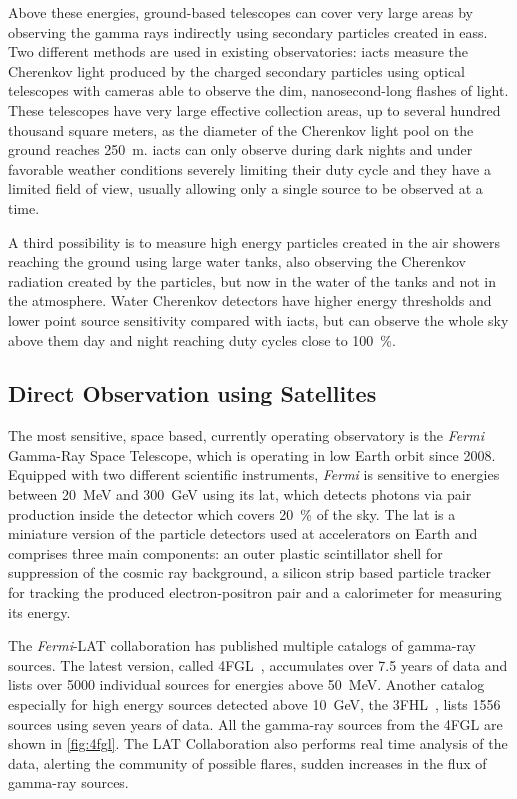 Above these energies, ground-based telescopes can cover very large areas by observing
the gamma rays indirectly using secondary particles created in \glspl{eas}.
Two different methods are used in existing observatories:
\glspl{iact} measure the Cherenkov light produced by the charged secondary particles
using optical telescopes with cameras able to observe the dim, nanosecond-long flashes
of light.
These telescopes have very large effective collection areas, up to several hundred thousand square meters,
as the diameter of the Cherenkov light pool on the ground reaches \SI{250}{\meter}.
\glspl{iact} can only observe during dark nights and under favorable weather conditions
severely limiting their duty cycle and they have a limited field of view, usually
allowing only a single source to be observed at a time.

A third possibility is to measure high energy particles created in the air showers
reaching the ground using large water tanks, also observing the Cherenkov radiation
created by the particles, but now in the water of the tanks and not in the atmosphere.
Water Cherenkov detectors have higher energy thresholds and lower point source
sensitivity compared with \glspl{iact}, but can observe the whole sky above them
day and night reaching duty cycles close to \SI{100}{\percent}.

\subsection{Direct Observation using Satellites}
The most sensitive, space based,
currently operating observatory is the \textit{Fermi} Gamma-Ray Space Telescope,
which is operating in low Earth orbit since 2008.
Equipped with two different scientific instruments, \textit{Fermi}
is sensitive to energies between \SI{20}{\MeV} and \SI{300}{\GeV} using
its \gls{lat}, which detects photons via pair production inside the detector
which covers \SI{20}{\percent} of the sky.
The \gls{lat} is a miniature version of the particle detectors used
at accelerators on Earth and comprises three main components:
an outer plastic scintillator shell for suppression of the cosmic ray background,
a silicon strip based particle tracker for tracking the produced electron-positron
pair and a calorimeter for measuring its energy.

The \textit{Fermi}-LAT collaboration has published multiple catalogs of
gamma-ray sources.
The latest version, called 4FGL~\cite{4fgl}, accumulates over 7.5 years of data
and lists over 5000 individual sources for energies above \SI{50}{\MeV}.
Another catalog especially for high energy sources detected above \SI{10}{\GeV}, the
3FHL~\cite{3fhl}, lists 1556 sources using seven years of data.
All the gamma-ray sources from the 4FGL are shown in \autoref{fig:4fgl}.
The LAT Collaboration also performs real time analysis of the data, 
alerting the community of possible flares, sudden increases in the flux of gamma-ray sources.

